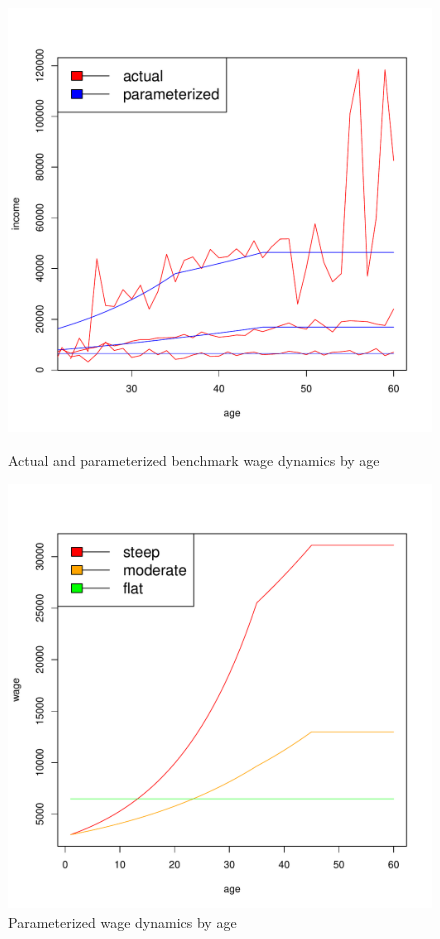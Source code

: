 \documentclass[]{article}
\begin{document}
\begin{figure}[h]
	\centering
    \begin{minipage}{0.45\textwidth}
		\centering
		\includegraphics[scale=0.4]{figs/heterwage.pdf}
		\caption{Actual and parameterized benchmark wage dynamics by age}
	\end{minipage}
	\hfill
    \begin{minipage}{0.45\textwidth}
		\centering
		\includegraphics[scale=0.4]{figs/heterwageless.pdf}
		\caption{Parameterized wage dynamics by age}
	\end{minipage}

\end{figure}
\end{document}
